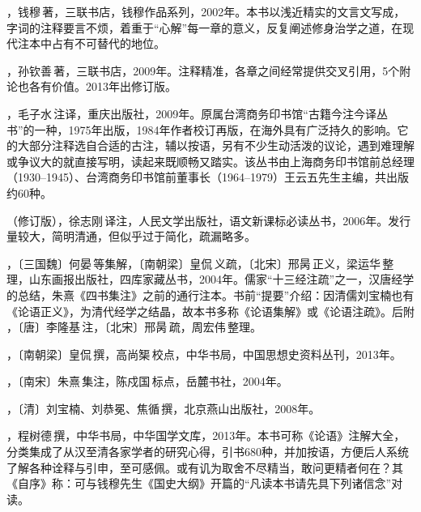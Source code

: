 ，钱穆\,著，三联书店，钱穆作品系列，2002年。本书以浅近精实的文言文写成，字词的注释要言不烦，着重于“心解”每一章的意义，反复阐述修身治学之道，在现代注本中占有不可替代的地位。

，孙钦善\,著，三联书店，2009年。注释精准，各章之间经常提供交叉引用，5个附论也各有价值。2013年出修订版。

，毛子水\,注译，重庆出版社，2009年。原属台湾商务印书馆“古籍今注今译丛书”的一种，1975年出版，1984年作者校订再版，在海外具有广泛持久的影响。它的大部分注释选自合适的古注，辅以按语，另有不少生动活泼的议论，遇到难理解或争议大的就直接写明，读起来既顺畅又踏实。该丛书由上海商务印书馆前总经理（1930--1945）、台湾商务印书馆前董事长（1964--1979）王云五先生主编，共出版约60种。

（修订版），徐志刚\,译注，人民文学出版社，语文新课标必读丛书，2006年。发行量较大，简明清通，但似乎过于简化，疏漏略多。

，〔三国魏〕何晏\,等集解，〔南朝梁〕皇侃\,义疏，〔北宋〕邢昺\,正义，梁运华\,整理，山东画报出版社，四库家藏丛书，2004年。儒家“十三经注疏”之一，汉唐经学的总结，朱熹《四书集注》之前的通行注本。书前“提要”介绍：因清儒刘宝楠也有《论语正义》，为清代经学之结晶，故本书多称《论语集解》或《论语注疏》。后附 ，〔唐〕李隆基\,注，〔北宋〕邢昺\,疏，周宏伟\,整理。

，〔南朝梁〕皇侃\,撰，高尚榘\,校点，中华书局，中国思想史资料丛刊，2013年。

，〔南宋〕朱熹\,集注，陈戍国\,标点，岳麓书社，2004年。

，〔清〕刘宝楠、刘恭冕、焦循\,撰，北京燕山出版社，2008年。

，程树德\,撰，中华书局，中华国学文库，2013年。本书可称《论语》注解大全，分类集成了从汉至清各家学者的研究心得，引书680种，并加按语，方便后人系统了解各种诠释与引申，至可感佩。或有讥为取舍不尽精当，敢问更精者何在？其《自序》称：可与钱穆先生《国史大纲》开篇的“凡读本书请先具下列诸信念”对读。

